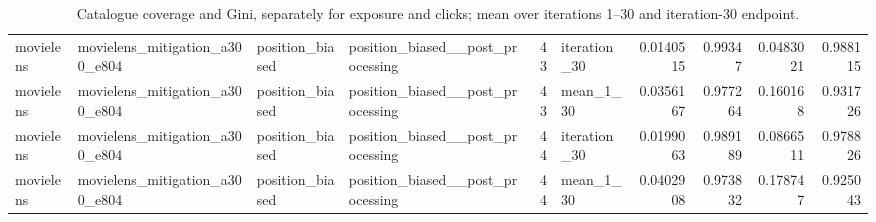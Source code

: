 \begin{table}[htbp!]
\begin{tabular}{llllrlrrrr}
movielens & movielens\_mitigation\_a300\_e804 & position\_biased & position\_biased\_\_post\_processing & 43 & iteration\_30 & 0.0140515 & 0.99347 & 0.0483021 & 0.988115 \\
movielens & movielens\_mitigation\_a300\_e804 & position\_biased & position\_biased\_\_post\_processing & 43 & mean\_1\_30 & 0.0356167 & 0.977264 & 0.160168 & 0.931726 \\
movielens & movielens\_mitigation\_a300\_e804 & position\_biased & position\_biased\_\_post\_processing & 44 & iteration\_30 & 0.0199063 & 0.989189 & 0.0866511 & 0.978826 \\
movielens & movielens\_mitigation\_a300\_e804 & position\_biased & position\_biased\_\_post\_processing & 44 & mean\_1\_30 & 0.0402908 & 0.973832 & 0.178747 & 0.925043 \\
\hline
\end{tabular}
\caption{Catalogue coverage and Gini, separately for exposure and clicks; mean over iterations 1–30 and iteration-30 endpoint.}
\label{chap:results:tab:rq4_coverage_concentration}
\end{table}
